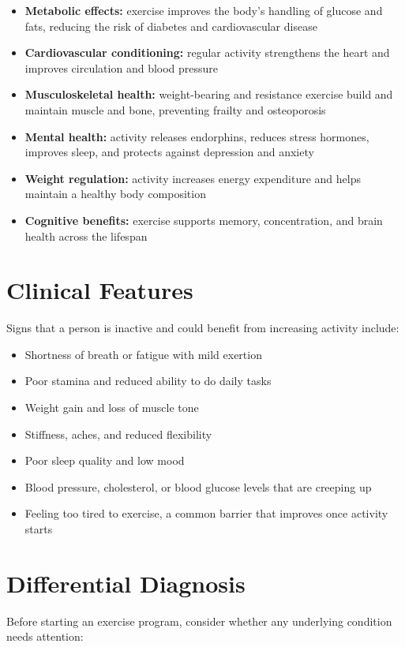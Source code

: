\begin{itemize}
    \item \textbf{Metabolic effects:} exercise improves the body's handling of glucose and fats, reducing the risk of diabetes and cardiovascular disease
    \item \textbf{Cardiovascular conditioning:} regular activity strengthens the heart and improves circulation and blood pressure
    \item \textbf{Musculoskeletal health:} weight-bearing and resistance exercise build and maintain muscle and bone, preventing frailty and osteoporosis
    \item \textbf{Mental health:} activity releases endorphins, reduces stress hormones, improves sleep, and protects against depression and anxiety
    \item \textbf{Weight regulation:} activity increases energy expenditure and helps maintain a healthy body composition
    \item \textbf{Cognitive benefits:} exercise supports memory, concentration, and brain health across the lifespan
\end{itemize}

\section*{Clinical Features}
Signs that a person is inactive and could benefit from increasing activity include:

\begin{itemize}
    \item Shortness of breath or fatigue with mild exertion
    \item Poor stamina and reduced ability to do daily tasks
    \item Weight gain and loss of muscle tone
    \item Stiffness, aches, and reduced flexibility
    \item Poor sleep quality and low mood
    \item Blood pressure, cholesterol, or blood glucose levels that are creeping up
    \item Feeling too tired to exercise, a common barrier that improves once activity starts
\end{itemize}

\section*{Differential Diagnosis}
Before starting an exercise program, consider whether any underlying condition needs attention:

